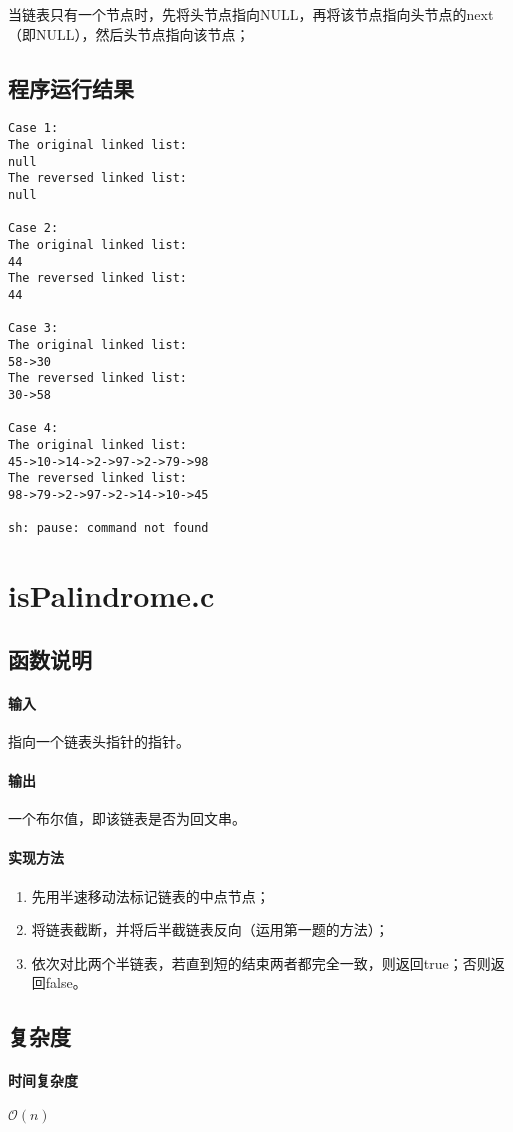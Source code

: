 \documentclass{homework}
\begin{document}
当链表只有一个节点时，先将头节点指向NULL，再将该节点指向头节点的next（即NULL），然后头节点指向该节点；
\subsection{程序运行结果}
\begin{lstlisting}[numbers=none]
Case 1: 
The original linked list:
null
The reversed linked list:
null

Case 2: 
The original linked list:
44  
The reversed linked list:
44  

Case 3: 
The original linked list:
58->30  
The reversed linked list:
30->58  

Case 4: 
The original linked list:
45->10->14->2->97->2->79->98  
The reversed linked list:
98->79->2->97->2->14->10->45

sh: pause: command not found
\end{lstlisting}
\section{isPalindrome.c}
\subsection{函数说明}
\paragraph{输入}
指向一个链表头指针的指针。
\paragraph{输出}
一个布尔值，即该链表是否为回文串。
\paragraph{实现方法}
\begin{enumerate}
    \item 先用半速移动法标记链表的中点节点；
    \item 将链表截断，并将后半截链表反向（运用第一题的方法）；
    \item 依次对比两个半链表，若直到短的结束两者都完全一致，则返回true；否则返回false。
\end{enumerate}
\subsection{复杂度}
\paragraph{时间复杂度}
$\mathcal{O}(n)$
\end{document}
